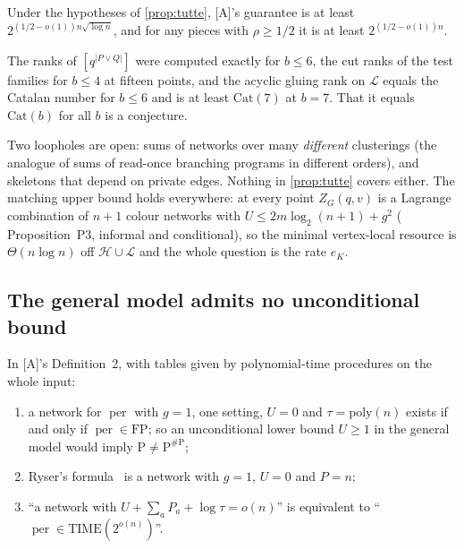 \documentclass[10pt]{amsart}
\theoremstyle{plain}
\theoremstyle{definition}
\theoremstyle{remark}
\numberwithin{equation}{section}
\newcommand{\A}{\textup{[A]}}
\newcommand{\per}{\operatorname{per}}
\begin{document}
\begin{corollary}\label{cor:Bprime}
Under the hypotheses of \cref{prop:tutte}, \A's guarantee is at least $2^{(1/2-o(1))n\sqrt{\log n}}$,
and for any pieces with $\rho\ge1/2$ it is at least $2^{(1/2-o(1))n}$.
\end{corollary}

\begin{remark}\label{rem:tutteranks}
The ranks of $[q^{|P\vee Q|}]$ were computed exactly for $b\le6$, the cut ranks of the test families
for $b\le4$ at fifteen points, and the acyclic gluing rank on $\mathcal L$ equals the Catalan number
for $b\le6$ and is at least $\mathrm{Cat}(7)$ at $b=7$. That it equals $\mathrm{Cat}(b)$ for all $b$ is a
conjecture.
\end{remark}

\noindent Two loopholes are open: sums of networks over many \emph{different} clusterings (the analogue
of sums of read-once branching programs in different orders), and skeletons that depend on private
edges. Nothing in \cref{prop:tutte} covers either. The matching upper bound holds everywhere: at every
point $Z_G(q,v)$ is a Lagrange combination of $n+1$ colour networks with
$U\le2m\log_2(n+1)+g^2$ ( Proposition~P3, informal and conditional), so the
minimal vertex-local resource is $\Theta(n\log n)$ off $\mathcal H\cup\mathcal L$ and the whole question
is the rate $e_K$.

\subsection{The general model admits no unconditional bound}\label{sec:general}
\begin{proposition}\label{prop:general}
In \A's Definition~2, with tables given by polynomial-time procedures on the whole input:
\begin{enumerate}[label=(\alph*)]
\item a network for $\per$ with $g=1$, one setting, $U=0$ and $\tau=\mathrm{poly}(n)$ exists if and only
if $\per\in\mathrm{FP}$; so an unconditional lower bound $U\ge1$ in the general model would imply
$\mathrm P\ne\mathrm P^{\#\mathrm P}$;
\item Ryser's formula~\cite{Ryser63} is a network with $g=1$, $U=0$ and $P=n$;
\item ``a network with $U+\sum_aP_a+\log\tau=o(n)$'' is equivalent to ``$\per\in\mathrm{TIME}(2^{o(n)})$''.
\end{enumerate}
\end{proposition}
\end{document}
